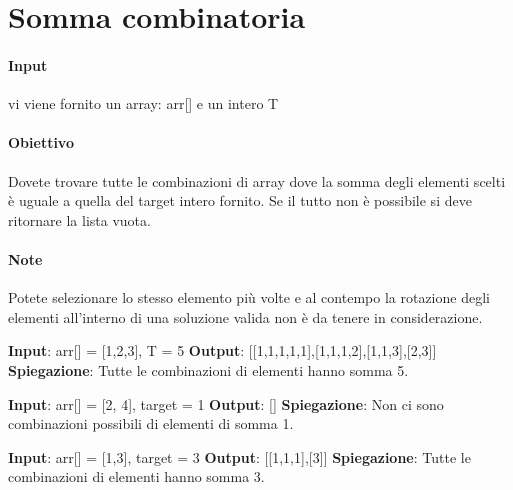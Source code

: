 \newpage
\thispagestyle{chapterInit}
\section*{Somma combinatoria}
    \paragraph{Input} vi viene fornito un array: arr[] e un intero T
    \paragraph{Obiettivo} Dovete trovare tutte le combinazioni di array dove la somma degli elementi scelti è uguale a quella del target intero fornito. Se il tutto non è possibile si deve ritornare la lista vuota.
    \paragraph{Note} Potete selezionare lo stesso elemento più volte e al contempo la rotazione degli elementi all'interno di una soluzione valida non è da tenere in considerazione. 
    \begin{esempio}
        \newline
        \textbf{Input}: arr[] = [1,2,3], T = 5
        \newline
        \textbf{Output}: [[1,1,1,1,1],[1,1,1,2],[1,1,3],[2,3]]
        \newline
        \textbf{Spiegazione}: Tutte le combinazioni di elementi hanno somma 5.
    \end{esempio}
    \begin{esempio}
        \newline
        \textbf{Input}: arr[] = [2, 4], target = 1
        \newline
        \textbf{Output}: []
        \newline
        \textbf{Spiegazione}: Non ci sono combinazioni possibili di elementi di somma 1.
    \end{esempio}
    \begin{esempio}
        \newline
        \textbf{Input}: arr[] = [1,3], target = 3
        \newline
        \textbf{Output}: [[1,1,1],[3]]
        \newline
        \textbf{Spiegazione}: Tutte le combinazioni di elementi hanno somma 3.
    \end{esempio}
\newpage
\thispagestyle{chapterInit}
